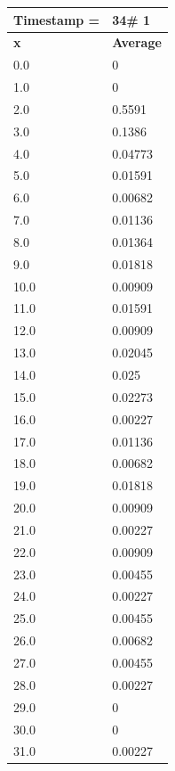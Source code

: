 \begin{tabular}{|l||l|}
\hline
\textbf{Timestamp =} & \textbf{34}\# 1\\\hline
	\textbf{x} & \textbf{Average} \\ \hline
\hline
	0.0 & 0 \\ \hline
	1.0 & 0 \\ \hline
	2.0 & 0.5591 \\ \hline
	3.0 & 0.1386 \\ \hline
	4.0 & 0.04773 \\ \hline
	5.0 & 0.01591 \\ \hline
	6.0 & 0.00682 \\ \hline
	7.0 & 0.01136 \\ \hline
	8.0 & 0.01364 \\ \hline
	9.0 & 0.01818 \\ \hline
	10.0 & 0.00909 \\ \hline
	11.0 & 0.01591 \\ \hline
	12.0 & 0.00909 \\ \hline
	13.0 & 0.02045 \\ \hline
	14.0 & 0.025 \\ \hline
	15.0 & 0.02273 \\ \hline
	16.0 & 0.00227 \\ \hline
	17.0 & 0.01136 \\ \hline
	18.0 & 0.00682 \\ \hline
	19.0 & 0.01818 \\ \hline
	20.0 & 0.00909 \\ \hline
	21.0 & 0.00227 \\ \hline
	22.0 & 0.00909 \\ \hline
	23.0 & 0.00455 \\ \hline
	24.0 & 0.00227 \\ \hline
	25.0 & 0.00455 \\ \hline
	26.0 & 0.00682 \\ \hline
	27.0 & 0.00455 \\ \hline
	28.0 & 0.00227 \\ \hline
	29.0 & 0 \\ \hline
	30.0 & 0 \\ \hline
	31.0 & 0.00227 \\ \hline
\end{tabular}
